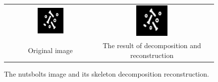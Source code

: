 \documentclass[a4paper]{article}
\begin{document}
\begin{enumerate}
\begin{figure}[H]
\begin{tabular}{ccc}
    \includegraphics[width=0.3\textwidth]{../lab4ex1/nutsbolts.png} & \includegraphics[width=0.3\textwidth]{../lab4ex1/recon.png}  & \\
    Original image & The result of decomposition and reconstruction \\
\end{tabular}
\caption{The nutsbolts image and its skeleton decomposition reconstruction.}
\label{fig:nutsbolts}
\end{figure}
\end{enumerate}
\end{document}
